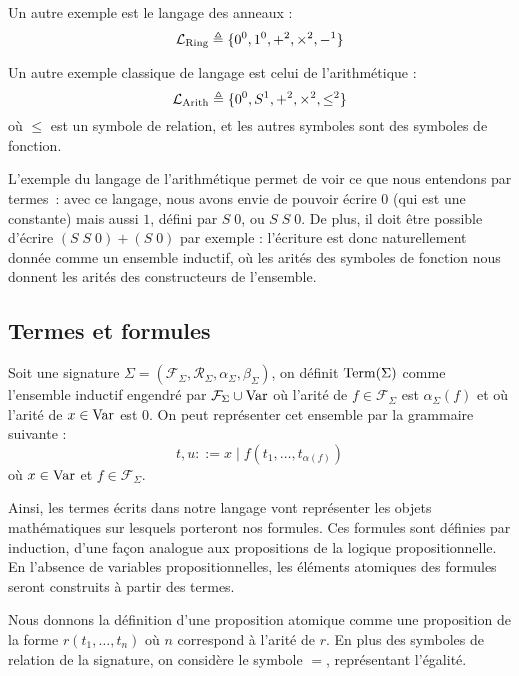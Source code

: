 \begin{example}
  Un autre exemple est le langage des anneaux :
  \[\mathcal L_{\mathrm{Ring}}\triangleq \{0^0,1^0,+^2,\times^2,-^1\}\]
\end{example}

\begin{example}
  Un autre exemple classique de langage est celui de l'arithmétique :
  \[\mathcal L_{\mathrm{Arith}}\triangleq \{0^0, S^1, +^2,\times^2,\leq^2\}\]
  où $\leq$ est un symbole de relation, et les autres symboles sont des symboles
  de fonction.
\end{example}

L'exemple du langage de l'arithmétique permet de voir ce que nous entendons par
termes~: avec ce langage, nous avons envie de pouvoir écrire $0$ (qui est une
constante) mais aussi $1$, défini par $S\;0$, ou $S\;S\;0$. De plus, il doit
être possible d'écrire $(S\;S\;0) + (S\;0)$ par exemple : l'écriture est donc
naturellement donnée comme un ensemble inductif, où les arités des symboles de
fonction nous donnent les arités des constructeurs de l'ensemble.

\subsection{Termes et formules}

\begin{definition}[Termes]
  Soit une signature
  $\Sigma = (\mathcal F_\Sigma,\mathcal R_\Sigma, \alpha_\Sigma,\beta_\Sigma)$,
  on définit $\operatorname{Term}(\Sigma)$ comme l'ensemble inductif engendré par
  $\mathcal F_\Sigma\cup\operatorname{Var}$ où l'arité de $f\in\mathcal F_\Sigma$ est
  $\alpha_\Sigma(f)$ et où l'arité de $x\in \operatorname{Var}$ est $0$. On peut représenter
  cet ensemble par la grammaire suivante :
  \[t,u ::= x \mid f(t_1,\ldots,t_{\alpha(f)})\]
  où $x\in \operatorname{Var}$ et $f\in \mathcal F_\Sigma$.
\end{definition}

Ainsi, les termes écrits dans notre langage vont représenter les objets
mathématiques sur lesquels porteront nos formules. Ces formules sont définies
par induction, d'une façon analogue aux propositions de la logique
propositionnelle. En l'absence de variables propositionnelles, les éléments
atomiques des formules seront construits à partir des termes.

Nous donnons la définition d'une proposition atomique comme une proposition de
la forme $r(t_1,\ldots,t_n)$ où $n$ correspond à l'arité de $r$. En plus des
symboles de relation de la signature, on considère le symbole $=$, représentant
l'égalité.

